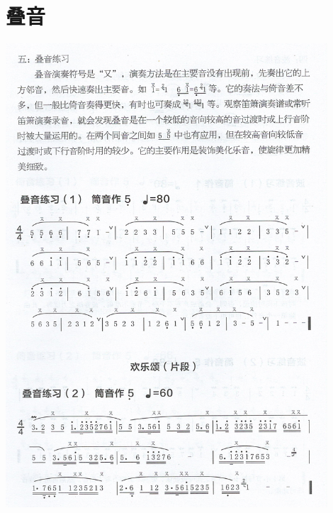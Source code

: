 \documentclass[cn,pad,twocol]{elegantbook}
\begin{document}
\section{叠音}
    \includegraphics[width=0.9\textwidth]{dongxiao/Scan 11.jpeg}
\end{document}
